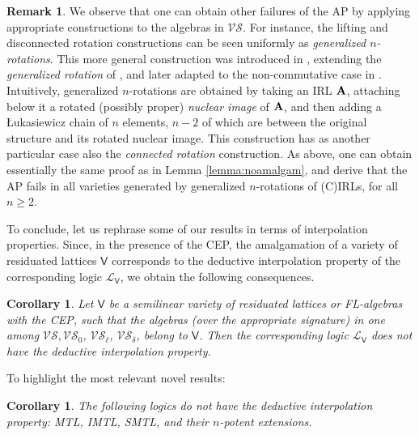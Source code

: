 \documentclass{amsart}
\newtheorem{corollary}[theorem]{Corollary}
\theoremstyle{definition}
\newtheorem{remark}[theorem]{Remark}
\numberwithin{equation}{section}
\newcommand{\alg}[1]{{\textbf{\upshape #1}}}  %
\newcommand{\vv}[1]{\mathsf {#1}}
\newcommand{\cc}[1]{\mathcal{#1}}
\newcommand{\VS}{\mathcal{VS}}
\begin{document}
\begin{remark}
	We observe that one can obtain other failures of the AP by applying appropriate constructions to the algebras in $\VS$. For instance, the lifting and disconnected rotation constructions can be seen uniformly as {\em generalized $n$-rotations}. This more general construction was introduced in \cite{BMU19}, extending the {\em generalized rotation} of \cite{AFU}, and  later adapted to the non-commutative case in \cite{GalatosUgolini}. Intuitively, generalized $n$-rotations are obtained by taking an IRL $\alg A$, attaching below it a rotated (possibly proper) \emph{nuclear image} of $\alg A$, and then adding a \L ukasiewicz chain of $n$ elements, $n-2$ of which are between the original structure and its rotated nuclear image. This construction has as another particular case  also the {\em connected rotation} construction. As above, one can obtain essentially the same proof as in Lemma \ref{lemma:noamalgam}, and derive that the AP fails in all varieties generated by generalized $n$-rotations of (C)IRLs, for all $n \geq 2$. 
\end{remark}

To conclude, let us rephrase some of our results in terms of interpolation properties. Since, in the presence of the CEP, the amalgamation of a variety of residuated lattices $\vv V$ corresponds to the deductive interpolation property of the corresponding logic $\cc L_{\vv V}$, we obtain the following consequences.
\begin{corollary}
	Let $\vv V$ be a semilinear variety of residuated lattices or FL-algebras with the CEP, such that the algebras (over the appropriate signature) in one among $\VS, \VS_0$, $\VS_\ell$, $\VS_\delta$, belong to $\vv V$. Then the corresponding logic $\cc L_{\vv V}$ does not have the deductive interpolation property. 
\end{corollary}
To highlight the most relevant novel results:
\begin{corollary}
	The following logics do not have the deductive interpolation property: MTL, IMTL, SMTL, and their $n$-potent extensions.
\end{corollary}
\end{document}
